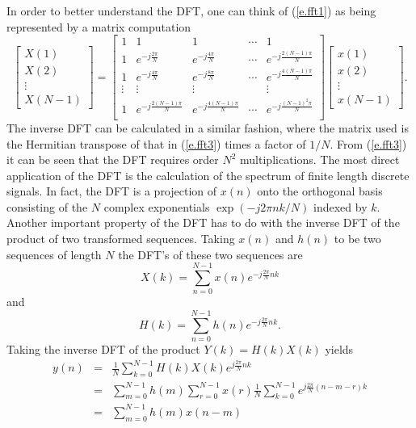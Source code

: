 	In order to better understand the DFT, one can think of 
(\ref{e.fft1}) as being represented by a matrix computation
%
\begin{equation}
\left[\begin{array}{c}
X(1)\\X(2)\\\vdots\\X(N-1)\end{array}\right]
=
\left[\begin{array}{ccccc}
1&1&1&\cdots&1\\
1&e^{-j\frac{2\pi}{N}}&e^{-j\frac{4\pi}{N}}&\cdots&e^{-j\frac{2(N-1)\pi}{N}}\\
1&e^{-j\frac{4\pi}{N}}&e^{-j\frac{8\pi}{N}}&\cdots&e^{-j\frac{4(N-1)\pi}{N}}\\
\vdots&\vdots&\vdots&&\vdots\\
1&e^{-j\frac{2(N-1)\pi}{N}}&e^{-j\frac{4(N-1)\pi}{N}}&\cdots&e^{-j\frac{(N-1)^2\pi}{N}}\\
\end{array}\right]
\left[\begin{array}{c}
x(1)\\x(2)\\\vdots\\x(N-1)\end{array}\right].
\label{e.fft3}
\end{equation}
%
The inverse DFT can be calculated in a similar fashion, where the
matrix used is the Hermitian transpose of that in (\ref{e.fft3})
times a factor of $1/N$.
From (\ref{e.fft3}) it can be seen that the DFT requires order
$N^2$ multiplications.  
The most direct application of the DFT is
the calculation of the spectrum of finite
length discrete signals.  In fact, the DFT 
is a projection of $x(n)$ onto the orthogonal
basis consisting of the $N$ complex
exponentials $\exp(-j2\pi nk/N)$ indexed by $k$.
	Another important property of the DFT has to do with the
inverse DFT of the product of two transformed sequences.
Taking $x(n)$ and $h(n)$ to be two sequences of length $N$
the DFT's of these two sequences are
%
\begin{equation}
X(k)=\sum_{n=0}^{N-1}x(n)e^{-j\frac{2\pi}{N}nk}
\label{e.fft4}
\end{equation}
%
and
%
\begin{equation}
H(k)=\sum_{n=0}^{N-1}h(n)e^{-j\frac{2\pi}{N}nk}.
\label{e.fft5}
\end{equation}
%
Taking the inverse DFT of the product $Y(k)=H(k)X(k)$ yields
%
\begin{eqnarray}
y(n)&=&\frac{1}{N}\sum_{k=0}^{N-1}H(k)X(k)e^{j\frac{2\pi}{N}nk}\nonumber\\
    &=&\sum_{m=0}^{N-1}h(m)\sum_{r=0}^{N-1}x(r)\frac{1}{N}\sum_{k=0}^{N-1}e^{j\frac{2\pi}{N}(n-m-r)k}\nonumber\\
    &=&\sum_{m=0}^{N-1}h(m)x(n-m)
\label{e.fft6}
\end{eqnarray}
